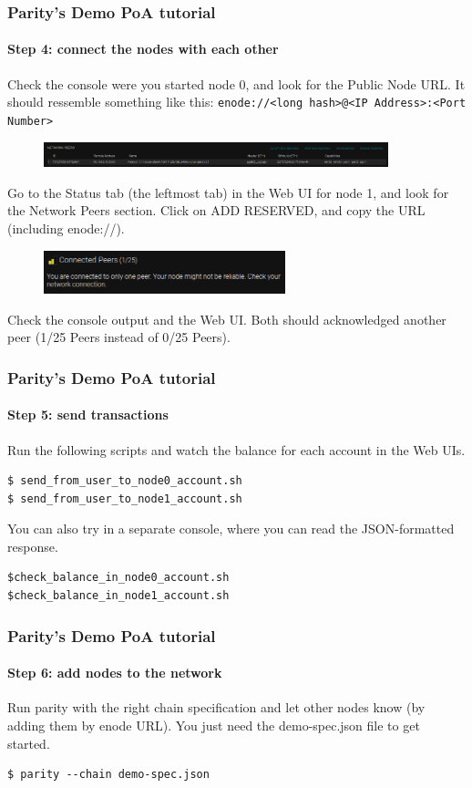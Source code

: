 \begin{frame}[fragile]
	\frametitle{Parity's Demo PoA tutorial}
	\framesubtitle{Step 4: connect the nodes with each other}
	Check the console were you started node 0, and look for the Public Node URL. It should ressemble something like this: \texttt{enode://<long hash>@<IP Address>:<Port Number>}
	\begin{figure}
		\includegraphics[width=10cm]{../pics/ethereum/parity-poa-tutorial/parity-poa-network-peers}
	\end{figure}
	Go to the Status tab (the leftmost tab) in the Web UI for node 1, and look for the Network Peers section. Click on ADD RESERVED, and copy the URL (including enode://).
	\begin{figure}
		\includegraphics[width=7cm]{../pics/ethereum/parity-poa-tutorial/parity-poa-connected-peers}
	\end{figure}
	Check the console output and the Web UI. Both should acknowledged another peer (1/25 Peers instead of 0/25 Peers).
\end{frame}

\begin{frame}[fragile]
	\frametitle{Parity's Demo PoA tutorial}
	\framesubtitle{Step 5: send transactions}
	Run the following scripts and watch the balance for each account in the Web UIs.
	\begin{Verbatim}[fontsize=\tiny]
$ send_from_user_to_node0_account.sh
$ send_from_user_to_node1_account.sh
	\end{Verbatim}
	You can also try in a separate console, where you can read the JSON-formatted response.
	\begin{Verbatim}[fontsize=\tiny]
$check_balance_in_node0_account.sh
$check_balance_in_node1_account.sh
	\end{Verbatim}
\end{frame}

\begin{frame}[fragile]
	\frametitle{Parity's Demo PoA tutorial}
	\framesubtitle{Step 6: add nodes to the network}
	Run parity with the right chain specification and let other nodes know (by adding them by enode URL). You just need the demo-spec.json file to get started.
	\begin{Verbatim}[fontsize=\tiny]
$ parity --chain demo-spec.json
	\end{Verbatim}
\end{frame}

